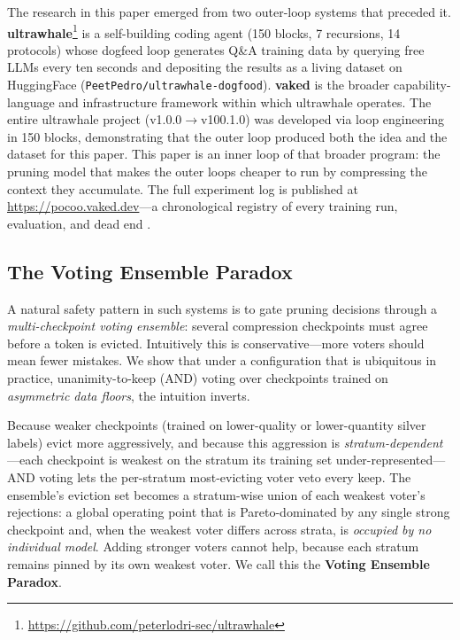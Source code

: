The research in this paper emerged from two outer-loop systems that preceded
it. \textbf{ultrawhale}\footnote{\url{https://github.com/peterlodri-sec/ultrawhale}}
is a self-building coding agent (150 blocks, 7 recursions, 14 protocols) whose
dogfeed loop generates Q\&A training data by querying free LLMs every ten
seconds and depositing the results as a living dataset on HuggingFace
(\texttt{PeetPedro/ultrawhale-dogfood}). \textbf{vaked} is the broader
capability-language and infrastructure framework within which ultrawhale
operates. The entire ultrawhale project (v1.0.0$\to$v100.1.0) was
developed via loop engineering in 150 blocks, demonstrating that the outer
loop produced both the idea and the dataset for this paper. This paper is
an inner loop of that broader program: the pruning model that makes the
outer loops cheaper to
 run by compressing the context they accumulate. The full experiment log is
 published at \url{https://pocoo.vaked.dev}---a chronological registry of
 every training run, evaluation, and dead end
 \citep{lodri2026sapirwhorf,lodri2026selflabeling,lodri2026heretic,
 lodri2026silverlabel,lodri2026loopkit,lodri2026loopshipped}.

\subsection{The Voting Ensemble Paradox}

A natural safety pattern in such systems is to gate pruning decisions through
a \emph{multi-checkpoint voting ensemble}: several compression checkpoints must
agree before a token is evicted. Intuitively this is conservative---more voters
should mean fewer mistakes. We show that under a configuration that is
ubiquitous in practice, unanimity-to-keep (AND) voting over checkpoints trained
on \emph{asymmetric data floors}, the intuition inverts.

Because weaker checkpoints (trained on lower-quality or lower-quantity silver
labels) evict more aggressively, and because this aggression is
\emph{stratum-dependent}---each checkpoint is weakest on the stratum its
training set under-represented---AND voting lets the per-stratum most-evicting
voter veto every keep. The ensemble's eviction set becomes a stratum-wise union
of each weakest voter's rejections: a global operating point that is
Pareto-dominated by any single strong checkpoint and, when the weakest voter
differs across strata, is \emph{occupied by no individual model}. Adding
stronger voters cannot help, because each stratum remains pinned by its own
weakest voter. We call this the \textbf{Voting Ensemble Paradox}.

